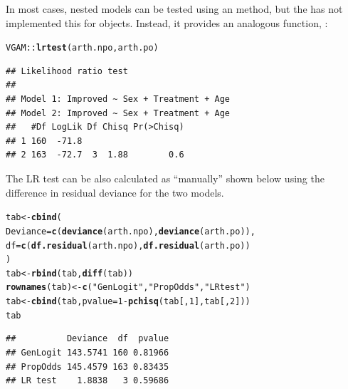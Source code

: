 \documentclass[11pt]{book}\usepackage[]{graphicx}\usepackage[]{color}
\makeatletter
\newcommand{\hlnum}[1]{\textcolor[rgb]{0.686,0.059,0.569}{#1}}%
\newcommand{\hlstr}[1]{\textcolor[rgb]{0.192,0.494,0.8}{#1}}%
\newcommand{\hlopt}[1]{\textcolor[rgb]{0,0,0}{#1}}%
\newcommand{\hlstd}[1]{\textcolor[rgb]{0.345,0.345,0.345}{#1}}%
\newcommand{\hlkwb}[1]{\textcolor[rgb]{0.69,0.353,0.396}{#1}}%
\newcommand{\hlkwc}[1]{\textcolor[rgb]{0.333,0.667,0.333}{#1}}%
\newcommand{\hlkwd}[1]{\textcolor[rgb]{0.737,0.353,0.396}{\textbf{#1}}}%
\newenvironment{kframe}{%
 \def\at@end@of@kframe{}%
 \ifinner\ifhmode%
  \def\at@end@of@kframe{\end{minipage}}%
  \begin{minipage}{\columnwidth}%
 \fi\fi%
 \def\FrameCommand##1{\hskip\@totalleftmargin \hskip-\fboxsep
 \colorbox{shadecolor}{##1}\hskip-\fboxsep
     \hskip-\linewidth \hskip-\@totalleftmargin \hskip\columnwidth}%
 \MakeFramed {\advance\hsize-\width
   \@totalleftmargin\z@ \linewidth\hsize
   \@setminipage}}%
 {\par\unskip\endMakeFramed%
 \at@end@of@kframe}
\newenvironment{knitrout}{}{} %
\renewenvironment{knitrout}{\small\renewcommand{\baselinestretch}{.85}}{} %
\makeatother
\begin{document}
In most cases, nested models can be tested using an  method,
but the  has not implemented this for  objects.
Instead, it provides an analogous function, :
\begin{knitrout}
\color{fgcolor}\begin{kframe}
\begin{alltt}
\hlstd{VGAM::}\hlkwd{lrtest}\hlstd{(arth.npo, arth.po)}
\end{alltt}
\begin{verbatim}
## Likelihood ratio test
## 
## Model 1: Improved ~ Sex + Treatment + Age
## Model 2: Improved ~ Sex + Treatment + Age
##   #Df LogLik Df Chisq Pr(>Chisq)
## 1 160  -71.8                    
## 2 163  -72.7  3  1.88        0.6
\end{verbatim}
\end{kframe}
\end{knitrout}

The LR test can be also calculated as ``manually'' shown below using the difference
in residual deviance for the two models.
\begin{knitrout}
\color{fgcolor}\begin{kframe}
\begin{alltt}
\hlstd{tab} \hlkwb{<-} \hlkwd{cbind}\hlstd{(}
  \hlkwc{Deviance} \hlstd{=} \hlkwd{c}\hlstd{(}\hlkwd{deviance}\hlstd{(arth.npo),} \hlkwd{deviance}\hlstd{(arth.po)),}
        \hlkwc{df} \hlstd{=} \hlkwd{c}\hlstd{(}\hlkwd{df.residual}\hlstd{(arth.npo),} \hlkwd{df.residual}\hlstd{(arth.po))}
        \hlstd{)}
\hlstd{tab} \hlkwb{<-} \hlkwd{rbind}\hlstd{(tab,} \hlkwd{diff}\hlstd{(tab))}
\hlkwd{rownames}\hlstd{(tab)} \hlkwb{<-} \hlkwd{c}\hlstd{(}\hlstr{"GenLogit"}\hlstd{,} \hlstr{"PropOdds"}\hlstd{,} \hlstr{"LR test"}\hlstd{)}
\hlstd{tab} \hlkwb{<-} \hlkwd{cbind}\hlstd{(tab,} \hlkwc{pvalue}\hlstd{=}\hlnum{1}\hlopt{-}\hlkwd{pchisq}\hlstd{(tab[,}\hlnum{1}\hlstd{], tab[,}\hlnum{2}\hlstd{]))}
\hlstd{tab}
\end{alltt}
\begin{verbatim}
##          Deviance  df  pvalue
## GenLogit 143.5741 160 0.81966
## PropOdds 145.4579 163 0.83435
## LR test    1.8838   3 0.59686
\end{verbatim}
\end{kframe}
\end{knitrout}
\end{document}
